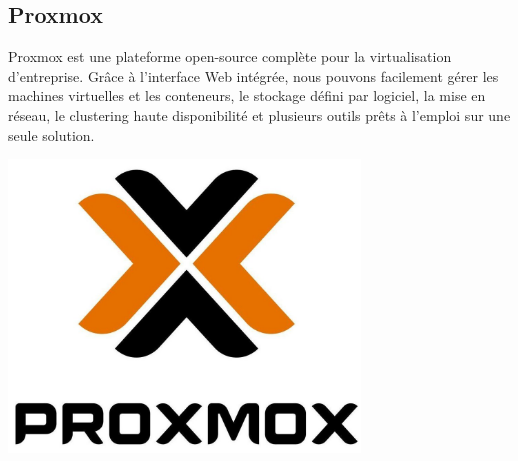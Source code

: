 \documentclass[12pt]{article}
\begin{document}
\subsection{\gls{Proxmox}}
\noindent%
\begin{minipage}{.7\textwidth}%
\gls{Proxmox} est une plateforme open-source complète pour la virtualisation d'entreprise. 
Grâce à l'interface Web intégrée, nous pouvons facilement gérer les machines virtuelles et les conteneurs, le stockage défini par logiciel, la mise en réseau, le clustering haute disponibilité et plusieurs outils prêts à l'emploi sur une seule solution. \\

\end{minipage}%
\hfill
\begin{minipage}{.3\textwidth}%
\begin{center}
\includegraphics[width=0.7\textwidth]{src/logo_proxmox.JPG}
\end{center}
\end{minipage}%
\end{document}
